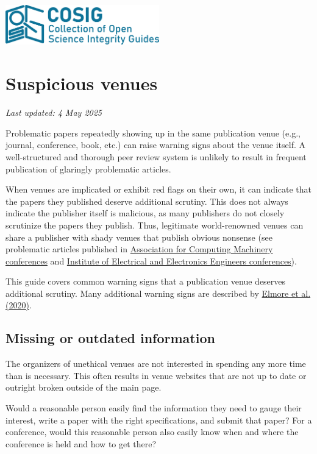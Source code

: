 \documentclass[letterpaper, 12pt]{article}
\begin{document}
\flushleft
\includegraphics[width=0.5\textwidth]{img/home/241017_final_logo_mockup.png}

\section*{Suspicious venues}
\textit{Last updated: 4 May 2025}

Problematic papers repeatedly showing up in the same publication venue (e.g., journal, conference, book, etc.) can raise warning signs about the venue itself. A well-structured and thorough peer review system is unlikely to result in frequent publication of glaringly problematic articles.

When venues are implicated or exhibit red flags on their own, it can indicate that the papers they published deserve additional scrutiny.
This does not always indicate the publisher itself is malicious, as many publishers do not closely scrutinize the papers they publish.
Thus, legitimate world-renowned venues can share a publisher with shady venues that publish obvious nonsense (see problematic articles published in \href{https://solalpirelli.github.io/2023/01/25/troubling-acm-venues.html}{Association for Computing Machinery conferences} and \href{https://deevybee.blogspot.com/2025/02/ieee-has-pseudoscience-problem.html}{Institute of Electrical and Electronics Engineers conferences}).

This guide covers common warning signs that a publication venue deserves additional scrutiny. Many additional warning signs are described by \href{https://doi.org/10.1177/0192623320920209}{Elmore et al. (2020)}.

\subsection*{Missing or outdated information}

The organizers of unethical venues are not interested in spending any more time than is necessary.
This often results in venue websites that are not up to date or outright broken outside of the main page.

Would a reasonable person easily find the information they need to gauge their interest,
write a paper with the right specifications, and submit that paper?
For a conference, would this reasonable person also easily know when and where the conference is held and how to get there?
\end{document}
